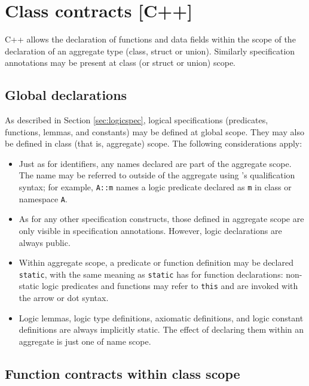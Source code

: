 \section{Class contracts [C++]}
\label{sec:class-contracts}

C++ allows the declaration of functions and data fields within
the scope of the declaration of an aggregate type (class, struct or union). Similarly \NAME{} specification annotations
may be present at class (or struct or union) scope.

\subsection{Global declarations}

As described in Section \ref{sec:logicspec}, logical specifications (predicates, functions, lemmas, and constants) may be defined at global scope. They may also be defined in class (that is, aggregate) scope. The following considerations apply:
\begin{itemize}
	\item Just as for \lang{} identifiers, any names 
	declared are part of the aggregate scope. The name may
	be referred to outside of the aggregate using \lang's 
	qualification syntax; for example, \lstinline|A::m| names a 
	logic predicate declared as \lstinline|m| in class
	or namespace \lstinline|A|.
	\item As for any other specification constructs, those defined in aggregate scope are only visible in specification annotations. However, logic declarations are always public.
	\item Within aggregate scope, a predicate or function definition may be
	declared \lstinline|static|, with the same meaning as 
	\lstinline|static| has for \lang{} function 
	declarations: non-static logic predicates and functions
	may refer to \lstinline|this| and are invoked with the
	\lang{} arrow or dot syntax.

	\item Logic lemmas, logic type definitions, axiomatic definitions, and logic constant definitions are always implicitly static. The effect of declaring them within an aggregate is just one of name scope.
\end{itemize}


\subsection{Function contracts within class scope}

